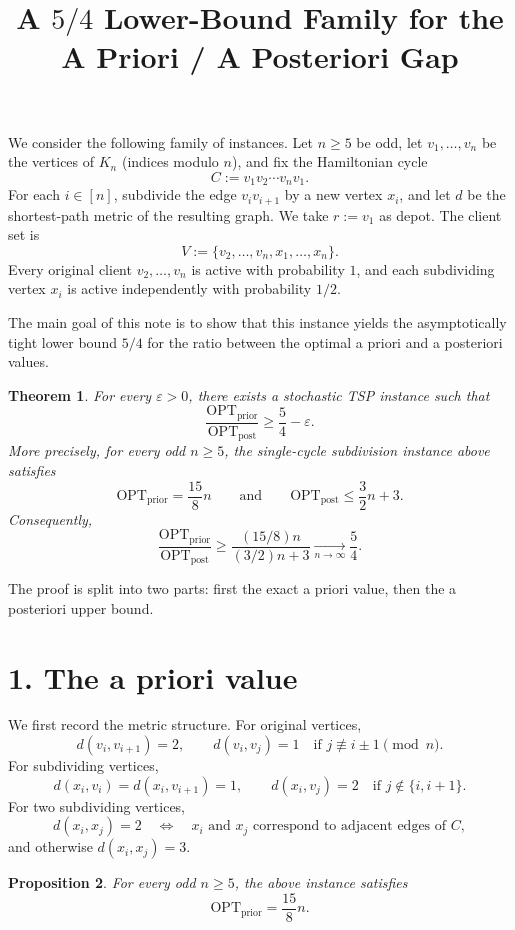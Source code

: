 \documentclass[11pt]{amsart}
\title{A $5/4$ Lower-Bound Family for the A Priori / A Posteriori Gap}
\author{}
\date{}
\newtheorem{theorem}{Theorem}
\newtheorem{proposition}[theorem]{Proposition}
\newcommand{\optprior}{\mathrm{OPT}_{\mathrm{prior}}}
\newcommand{\optpost}{\mathrm{OPT}_{\mathrm{post}}}
\begin{document}
\maketitle

We consider the following family of instances. Let $n\ge 5$ be odd, let $v_1,\dots,v_n$ be the vertices of $K_n$ (indices modulo $n$), and fix the Hamiltonian cycle
\[
C:=v_1v_2\cdots v_nv_1.
\]
For each $i\in[n]$, subdivide the edge $v_iv_{i+1}$ by a new vertex $x_i$, and let $d$ be the shortest-path metric of the resulting graph. We take $r:=v_1$ as depot. The client set is
\[
V:=\{v_2,\dots,v_n,x_1,\dots,x_n\}.
\]
Every original client $v_2,\dots,v_n$ is active with probability $1$, and each subdividing vertex $x_i$ is active independently with probability $1/2$.

The main goal of this note is to show that this instance yields the asymptotically tight lower bound $5/4$ for the ratio between the optimal a priori and a posteriori values.

\begin{theorem}\label{thm:main}
For every $\varepsilon>0$, there exists a stochastic TSP instance such that
\[
\frac{\optprior}{\optpost}\ge \frac54-\varepsilon.
\]
More precisely, for every odd $n\ge 5$, the single-cycle subdivision instance above satisfies
\[
\optprior=\frac{15}{8}n
\qquad\text{and}\qquad
\optpost\le \frac32 n+3.
\]
Consequently,
\[
\frac{\optprior}{\optpost}
\ge
\frac{(15/8)n}{(3/2)n+3}
\xrightarrow[n\to\infty]{} \frac54.
\]
\end{theorem}

The proof is split into two parts: first the exact a priori value, then the a posteriori upper bound.

\section*{1. The a priori value}

We first record the metric structure. For original vertices,
\[
d(v_i,v_{i+1})=2,
\qquad
 d(v_i,v_j)=1\quad\text{if } j\not\equiv i\pm 1 \pmod n.
\]
For subdividing vertices,
\[
d(x_i,v_i)=d(x_i,v_{i+1})=1,
\qquad
 d(x_i,v_j)=2\quad\text{if } j\notin\{i,i+1\}.
\]
For two subdividing vertices,
\[
d(x_i,x_j)=2
\quad\Longleftrightarrow\quad
x_i\text{ and }x_j\text{ correspond to adjacent edges of }C,
\]
and otherwise $d(x_i,x_j)=3$.

\begin{proposition}\label{prop:prior}
For every odd $n\ge 5$, the above instance satisfies
\[
\optprior=\frac{15}{8}n.
\]
\end{proposition}
\end{document}

